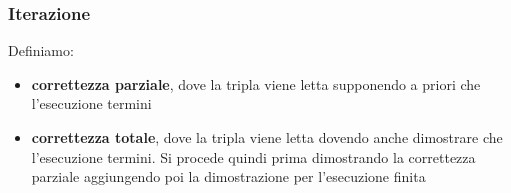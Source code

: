 \documentclass[a4paper,12pt, oneside]{book}
\begin{document}
\subsubsection{Iterazione}
\begin{definizione}
  Definiamo:
  \begin{itemize}
    \item \textbf{correttezza parziale}, dove la tripla viene letta supponendo a
    priori che l'esecuzione termini
    \item \textbf{correttezza totale}, dove la tripla viene letta dovendo anche
    dimostrare che l'esecuzione termini. Si procede quindi prima dimostrando la
    correttezza parziale aggiungendo poi la dimostrazione per l'esecuzione
    finita
  \end{itemize}
\end{definizione}
\end{document}
